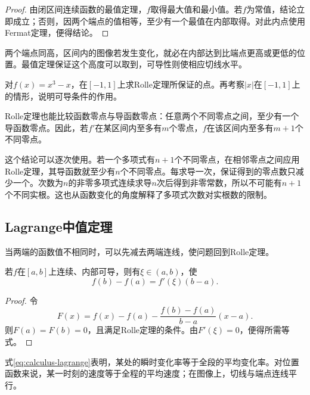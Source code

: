 \begin{proof}
由闭区间连续函数的最值定理，\(f\)取得最大值和最小值。若\(f\)为常值，结论立即成立；否则，因两个端点的值相等，至少有一个最值在内部取得。对此内点使用Fermat定理，便得结论。
\end{proof}

两个端点同高，区间内的图像若发生变化，就必在内部达到比端点更高或更低的位置。最值定理保证这个高度可以取到，可导性则使相应切线水平。

\begin{example}
对\(f(x)=x^3-x\)，在\([-1,1]\)上求Rolle定理所保证的点。再考察\(|x|\)在\([-1,1]\)上的情形，说明可导条件的作用。
\end{example}

Rolle定理也能比较函数零点与导函数零点：任意两个不同零点之间，至少有一个导函数零点。因此，若\(f'\)在某区间内至多有\(m\)个零点，\(f\)在该区间内至多有\(m+1\)个不同零点。

这个结论可以逐次使用。若一个多项式有\(n+1\)个不同零点，在相邻零点之间应用Rolle定理，其导函数就至少有\(n\)个不同零点。每求导一次，保证得到的零点数只减少一个。次数为\(n\)的非零多项式连续求导\(n\)次后得到非零常数，所以不可能有\(n+1\)个不同实根。这也从函数变化的角度解释了多项式次数对实根数的限制。

\subsection{Lagrange中值定理}

当两端的函数值不相同时，可以先减去两端连线，使问题回到Rolle定理。

\begin{theorem}[Lagrange中值定理]\label{thm:calculus-lagrange}
若\(f\)在\([a,b]\)上连续、内部可导，则有\(\xi\in(a,b)\)，使
\begin{equation}\label{eq:calculus-lagrange}
 f(b)-f(a)=f'(\xi)(b-a).
\end{equation}
\end{theorem}

\begin{proof}
令
\begin{equation*}
 F(x)=f(x)-f(a)-\frac{f(b)-f(a)}{b-a}(x-a).
\end{equation*}
则\(F(a)=F(b)=0\)，且满足Rolle定理的条件。由\(F'(\xi)=0\)，便得所需等式。
\end{proof}

式\eqref{eq:calculus-lagrange}表明，某处的瞬时变化率等于全段的平均变化率。对位置函数来说，某一时刻的速度等于全程的平均速度；在图像上，切线与端点连线平行。

